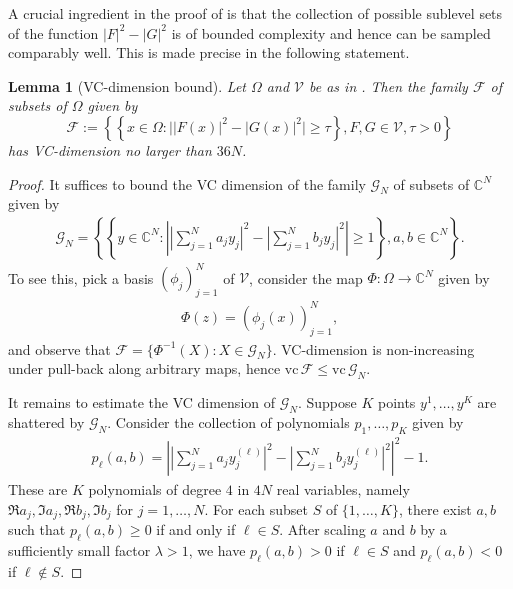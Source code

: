 \documentclass[11pt]{amsart}
\newtheorem{lemma}[theorem]{Lemma}
\newcommand{\C}{\mathbb C}
\newcommand{\vc}{\mathrm{vc}}
\begin{document}
A crucial ingredient in the proof of  is that the collection of possible sublevel sets of the function $|F|^2-|G|^2$ is of bounded complexity and hence can be sampled comparably well. This is made precise in the following statement.

\begin{lemma}[VC-dimension bound]
\label{lem:VCdimension}
Let $\Omega$ and $\mathscr V$ be as in . Then the family $\mathcal F$ of subsets of $\Omega$ given by
\[
    \mathcal F := \left\{ \left\{x \in \Omega: \big||F(x)|^2 - |G(x)|^2\big| \geq \tau \right\}, F,G \in \mathscr V, \tau > 0 \right\}
\]
has VC-dimension no larger than $36 N$.
\end{lemma}

\begin{proof}
    It suffices to bound the VC dimension of the family $\mathcal G_N$ of subsets of $\C^N$ given by
    \begin{align*}
        \mathcal G_N = \left\{ \left\{y \in \C^N: \left|\left|\textstyle\sum_{j=1}^{N} a_j y_j\right|^2 - \left|\textstyle\sum_{j=1}^{N} b_j y_j\right|^2\right| \geq 1 \right\}, a,b \in \mathbb C^N \right\}.
    \end{align*}
    To see this, pick a basis $(\phi_{j})_{j=1}^N$ of $\mathscr V$, consider the map $\Phi: \Omega \to \mathbb C^{N}$ given by 
    \begin{align*}
        \Phi(z) = \left( \phi_{j}(x)\right)_{j=1}^N,
    \end{align*}
    and observe that $\mathcal F = \{\Phi^{-1}(X): X \in \mathcal G_N\}$. VC-dimension is non-increasing under pull-back along arbitrary maps, hence $\vc\, \mathcal F \leq \vc\, \mathcal G_{N}$.

    It remains to estimate the VC dimension of $\mathcal G_N$. Suppose $K$ points $y^{1},\ldots,y^{K}$ are shattered by $\mathcal G_N$. Consider the collection of polynomials $p_{1},\ldots,p_{K}$ given by
    \begin{align*}
        p_{\ell}(a,b) = \left|\left|\textstyle\sum_{j=1}^{N} a_j y_j^{(\ell)}\right|^2 - \left|\textstyle\sum_{j=1}^{N} b_j y_j^{(\ell)} \right|^2\right|^2 - 1.
    \end{align*}
    These are $K$ polynomials of degree $4$ in $4N$ real variables, namely $\Re a_j, \Im a_j, \Re b_j, \Im b_j$ for $j=1,\ldots,N$. 
    For each subset $S$ of $\{1,\ldots, K\}$, there exist $a,b$ such that $p_{\ell}(a,b) \geq 0$ if and only if $\ell \in S$. After scaling $a$ and $b$ by a sufficiently small factor $\lambda > 1$, we have $p_{\ell}(a,b) > 0$ if $\ell \in S$ and $p_{\ell}(a,b) < 0$ if $\ell \not \in S$.
    

\end{proof}
\end{document}
